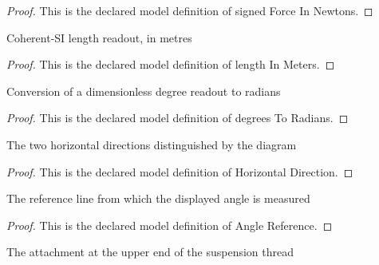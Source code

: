 \begin{proof}
  This is the declared model definition of signed Force In Newtons.
\end{proof}
\begin{definition}
  \label{def:physics:phyx-mini-0904:phyxminiproblems-problemphyxmini0904-lengthinmeters}
  Coherent-SI length readout, in metres
\end{definition}
\begin{proof}
  This is the declared model definition of length In Meters.
\end{proof}
\begin{definition}
  \label{def:physics:phyx-mini-0904:phyxminiproblems-problemphyxmini0904-degreestoradians}
  Conversion of a dimensionless degree readout to radians
\end{definition}
\begin{proof}
  This is the declared model definition of degrees To Radians.
\end{proof}
\begin{definition}
  \label{def:physics:phyx-mini-0904:phyxminiproblems-problemphyxmini0904-horizontaldirection}
  The two horizontal directions distinguished by the diagram
\end{definition}
\begin{proof}
  This is the declared model definition of Horizontal Direction.
\end{proof}
\begin{definition}
  \label{def:physics:phyx-mini-0904:phyxminiproblems-problemphyxmini0904-anglereference}
  The reference line from which the displayed angle is measured
\end{definition}
\begin{proof}
  This is the declared model definition of Angle Reference.
\end{proof}
\begin{definition}
  \label{def:physics:phyx-mini-0904:phyxminiproblems-problemphyxmini0904-upperattachment}
  The attachment at the upper end of the suspension thread
\end{definition}
